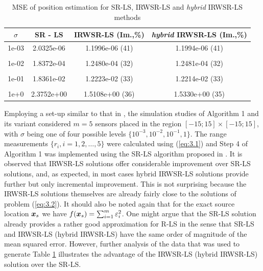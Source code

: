 \begin{table}[h]
\centering
\caption{MSE of position estimation for SR-LS, IRWSR-LS and \textit{hybrid} IRWSR-LS methods}
\begin{tabular}{|c|c|c|c|} \hline
\centering
$\sigma$ & SR - LS & IRWSR-LS (Im.,\%) & \textit{hybrid} IRWSR-LS (Im.,\%) \\ \hline
1e-03&	2.0325e-06&	1.1996e-06 (41)	& 1.1994e-06 (41)\\ &&&\\
1e-02&	1.8372e-04&	1.2480e-04 (32)	& 1.2481e-04 (32)\\ &&&\\
1e-01&	1.8361e-02&	1.2223e-02 (33)	& 1.2214e-02 (33)\\ &&&\\
1e+0&	2.3752e+00&	1.5108e+00 (36)	& 1.5330e+00 (35)\\ %
\hline
\end{tabular}
\label{tab:1}
\end{table}

Employing a set-up similar to that in \cite{BeckStLi}, the simulation studies of Algorithm 1 and its variant considered $m = 5$ sensors placed in the region $[-15;15]\times[-15;15]$, with $\sigma$ being one of four possible levels $\{10^{-3}, 10^{-2}, 10^{-1}, 1\}$. The range measurements $\{r_i, i=1, 2,\ldots,5\}$ were calculated using (\ref{eq:3.1}) and Step 4 of Algorithm 1 was implemented using the SR-LS algorithm proposed in \cite{BeckStLi}. It is observed that IRWSR-LS solutions offer considerable improvement over SR-LS solutions, and, as expected, in most cases hybrid IRWSR-LS solutions provide further but only incremental improvement. This is not surprising because the IRWSR-LS solutions themselves are already fairly close to the solutions of problem (\ref{eq:3.2}). It should also be noted again that for the exact source location $\mbox{\boldmath$x$}_s$ we have $f(\mbox{\boldmath$x$}_s) = \sum_{i=1}^m \varepsilon_i^2$. One might argue that the SR-LS solution already provides a rather good approximation for R-LS in the sense that SR-LS and IRWSR-LS (hybrid IRWSR-LS) have the same order of magnitude of the mean squared error. However, further analysis of the data that was used to generate Table \ref{tab:1} illustrates the advantage of the IRWSR-LS (hybrid IRWSR-LS) solution over the SR-LS.

